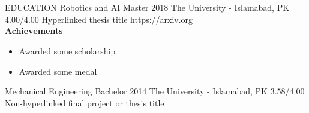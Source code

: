 \documentclass{my_cv}
\begin{document}
\section{\faGraduationCap}{EDUCATION}
    \school
        {Robotics and AI} %
        {Master} %
        {2018} %
        {The University - Islamabad, PK} %
        {4.00/4.00} %
        {Hyperlinked thesis title} %
        {https://arxiv.org} %
        \textbf{\\Achievements}
        \begin{itemize}
            \item Awarded some scholarship
            \item Awarded some medal
        \end{itemize}
    \school
        {Mechanical Engineering}
        {Bachelor}
        {2014}
        {The University - Islamabad, PK}
        {3.58/4.00}
        {Non-hyperlinked final project or thesis title}
        {}
\end{document}
